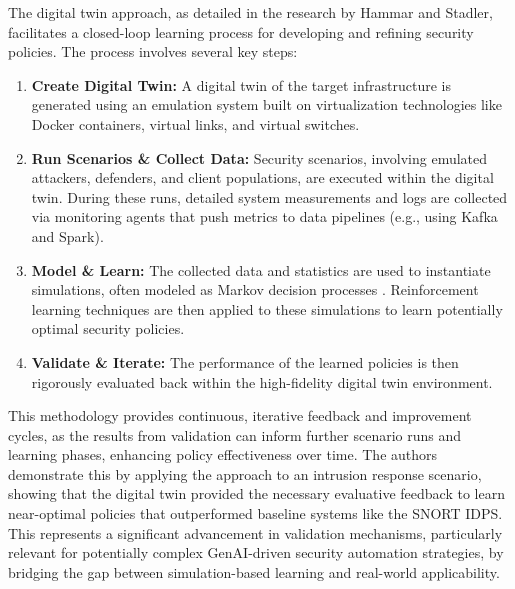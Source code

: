 The digital twin approach, as detailed in the research by Hammar and Stadler, facilitates a closed-loop learning process for developing and refining security policies\cite{hammar_digital_2023}. The process involves several key steps:
\begin{enumerate}
    \item \textbf{Create Digital Twin:} A digital twin of the target infrastructure is generated using an emulation system built on virtualization technologies like Docker containers, virtual links, and virtual switches\cite{hammar_digital_2023}.
    \item \textbf{Run Scenarios \& Collect Data:} Security scenarios, involving emulated attackers, defenders, and client populations, are executed within the digital twin\cite{hammar_digital_2023}. During these runs, detailed system measurements and logs are collected via monitoring agents that push metrics to data pipelines (e.g., using Kafka and Spark)\cite{hammar_digital_2023}.
    \item \textbf{Model \& Learn:} The collected data and statistics are used to instantiate simulations, often modeled as Markov decision processes \cite{hammar_digital_2023}. Reinforcement learning techniques are then applied to these simulations to learn potentially optimal security policies\cite{hammar_digital_2023}.
    \item \textbf{Validate \& Iterate:} The performance of the learned policies is then rigorously evaluated back within the high-fidelity digital twin environment\cite{hammar_digital_2023}.
\end{enumerate}

This methodology provides continuous, iterative feedback and improvement cycles, as the results from validation can inform further scenario runs and learning phases, enhancing policy effectiveness over time\cite{hammar_digital_2023}. The authors demonstrate this by applying the approach to an intrusion response scenario, showing that the digital twin provided the necessary evaluative feedback to learn near-optimal policies that outperformed baseline systems like the SNORT IDPS\cite{zhou_study_2010}. This represents a significant advancement in validation mechanisms, particularly relevant for potentially complex GenAI-driven security automation strategies, by bridging the gap between simulation-based learning and real-world applicability\cite{hammar_digital_2023}.

